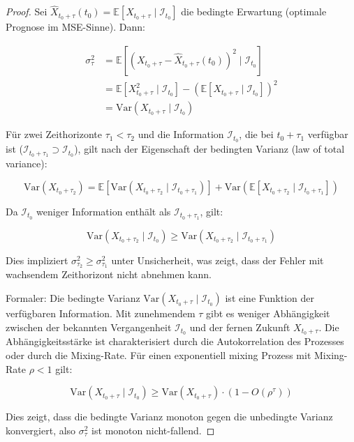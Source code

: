 \documentclass[12pt, a4paper, titlepage]{report}
\theoremstyle{definition}
\theoremstyle{remark}
\newcommand{\E}{\mathbb{E}}
\newcommand{\Var}{\mathrm{Var}}
\begin{document}
\begin{proof}
Sei $\hat{X}_{t_0+\tau}(t_0) = \E[X_{t_0+\tau} \mid \mathcal{I}_{t_0}]$ die bedingte Erwartung (optimale Prognose im MSE-Sinne). Dann:

\begin{align}
\sigma_\tau^2 &= \E\left[ \left( X_{t_0+\tau} - \hat{X}_{t_0+\tau}(t_0) \right)^2 \mid \mathcal{I}_{t_0} \right] \\
&= \E\left[ X_{t_0+\tau}^2 \mid \mathcal{I}_{t_0} \right] - \left( \E[X_{t_0+\tau} \mid \mathcal{I}_{t_0}] \right)^2 \\
&= \Var(X_{t_0+\tau} \mid \mathcal{I}_{t_0})
\end{align}

Für zwei Zeithorizonte $\tau_1 < \tau_2$ und die Information $\mathcal{I}_{t_0}$, die bei $t_0 + \tau_1$ verfügbar ist ($\mathcal{I}_{t_0+\tau_1} \supset \mathcal{I}_{t_0}$), gilt nach der Eigenschaft der bedingten Varianz (law of total variance):

\begin{equation}
\Var(X_{t_0+\tau_2}) = \E[\Var(X_{t_0+\tau_2} \mid \mathcal{I}_{t_0+\tau_1})] + \Var(\E[X_{t_0+\tau_2} \mid \mathcal{I}_{t_0+\tau_1}])
\end{equation}

Da $\mathcal{I}_{t_0}$ weniger Information enthält als $\mathcal{I}_{t_0+\tau_1}$, gilt:

\begin{equation}
\Var(X_{t_0+\tau_2} \mid \mathcal{I}_{t_0}) \geq \Var(X_{t_0+\tau_2} \mid \mathcal{I}_{t_0+\tau_1})
\end{equation}

Dies impliziert $\sigma_{\tau_2}^2 \geq \sigma_{\tau_1}^2$ unter Unsicherheit, was zeigt, dass der Fehler mit wachsendem Zeithorizont nicht abnehmen kann.

Formaler: Die bedingte Varianz $\Var(X_{t_0+\tau} \mid \mathcal{I}_{t_0})$ ist eine Funktion der verfügbaren Information. Mit zunehmendem $\tau$ gibt es weniger Abhängigkeit zwischen der bekannten Vergangenheit $\mathcal{I}_{t_0}$ und der fernen Zukunft $X_{t_0+\tau}$. Die Abhängigkeitsstärke ist charakterisiert durch die Autokorrelation des Prozesses oder durch die Mixing-Rate. Für einen exponentiell mixing Prozess mit Mixing-Rate $\rho < 1$ gilt:

\begin{equation}
\Var(X_{t_0+\tau} \mid \mathcal{I}_{t_0}) \geq \Var(X_{t_0+\tau}) \cdot (1 - O(\rho^\tau))
\end{equation}

Dies zeigt, dass die bedingte Varianz monoton gegen die unbedingte Varianz konvergiert, also $\sigma_\tau^2$ ist monoton nicht-fallend.
\end{proof}
\end{document}
